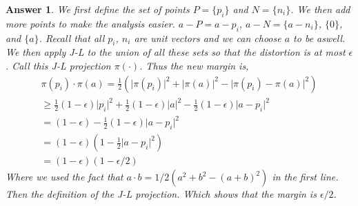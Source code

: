 \documentclass[12pt]{article}
\theoremstyle{colon}
\newtheorem*{answer}{Answer}
\begin{document}
\begin{answer}
  We first define the set of points $P = \{p_i\}$ and $N = \{n_i\}$. We then add more points to make the analysis easier. $a-P = {a-p_i}$, $a-N = \{a-n_i\}$, $\{0\}$, and $\{a\}$. Recall that all $p_i$, $n_i$ are unit vectors and we can choose $a$ to be aswell. We then apply J-L to the union of all these sets so that the distortion is at most $\epsilon$. Call this J-L projection $\pi(\cdot)$. Thus the new margin is,
  \begin{gather*}
    \pi(p_i) \cdot \pi (a) = \frac{1}{2} \left( \lvert \pi(p_i) \rvert^2 + \lvert \pi(a) \rvert^2 - \lvert \pi(p_i) -\pi(a) \rvert^2 \right) \\
    \geq \frac{1}{2}(1 - \epsilon)\lvert p_i \rvert^2 + \frac{1}{2}(1 - \epsilon)\lvert a \rvert^2 - \frac{1}{2}(1 - \epsilon)\lvert a - p_i \rvert^2 \\
    = (1 - \epsilon) - \frac{1}{2}(1 - \epsilon)\lvert a - p_i \rvert^2 \\
    = (1-\epsilon)(1 - \frac{1}{2}\lvert a - p_i \rvert^2) \\
    = (1-\epsilon)(1-\epsilon/2)
  \end{gather*}
  Where we used the fact that $a \cdot b = 1/2(a^2 + b^2 -(a+b)^2)$ in the first line. Then the definition of the J-L projection. Which shows that the margin is $\epsilon/2$.
\end{answer}

\clearpage
\end{document}
